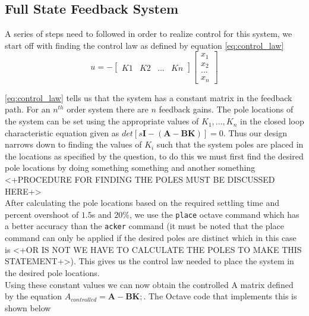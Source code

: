 \documentclass[a4paper, 12pt]{article}
\begin{document}

\subsection{Full State Feedback System} %
\label{sub:full_state_feedback_system}
A series of steps need to followed in order to realize control for this system, we start off with finding the control law as defined by equation \eqref{eq:control_law}
\begin{equation}
  u = -\left[
  \begin{array}{cccc}
    K1&K2&...&Kn
  \end{array}
  \right]
  \left[
  \begin{array}{c}
    x_1 \\
    x_2\\
    ...\\
    x_n
  \end{array}
  \right]
  \label{eq:control_law}
\end{equation}

\eqref{eq:control_law} tells us that the system has a constant matrix in the feedback path. For an $n^{th}$ order system there are $n$ feedback gains. The pole locations of the system can be set using the appropriate values  of $K_1, ... , K_n$ in the closed loop characteristic equation given as $det[s\textbf{I}-(\textbf{A}-\textbf{BK})] = 0$. Thus our design narrows down to finding the values of $K_i$ such that the system poles are placed in the locations as specified by the question, to do this we must first find the desired pole locations by doing something something and another something <+PROCEDURE FOR FINDING THE POLES MUST BE DISCUSSED HERE+>\\

After calculating the pole locations based on the required settling time and percent overshoot of $1.5$s and $20\%$, we use the \texttt{place} octave command which has a better accuracy than the \texttt{acker} command (it must be noted that the place command can only be applied if the desired poles are distinct which in this case is <+OR IS NOT WE HAVE TO CALCULATE THE POLES TO MAKE THIS STATEMENT+>). This gives us the control law needed to place the system in the desired pole locations.\\

Using these constant values we can now obtain the controlled A matrix defined by the equation $A_{controlled} = \textbf{A}-\textbf{B}\textbf{K};$. The Octave code that implements this is shown below
\end{document}
